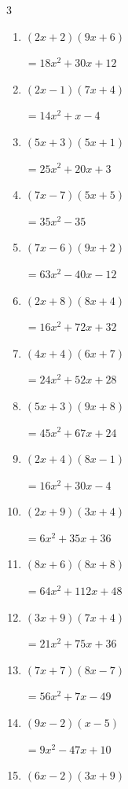 \begin{multicols}{3}
\begin{enumerate}
        $=12x^{2}-x-35$

\columnbreak %

  \item $(2x+2)(9x+6)$

        $=18x^{2}+30x+12$

  \item $(2x-1)(7x+4)$

        $=14x^{2}+x-4$

  \item $(5x+3)(5x+1)$

        $=25x^{2}+20x+3$

  \item $(7x-7)(5x+5)$

        $=35x^{2}-35$

  \item $(7x-6)(9x+2)$

        $=63x^{2}-40x-12$

  \item $(2x+8)(8x+4)$

        $=16x^{2}+72x+32$

  \item $(4x+4)(6x+7)$

        $=24x^{2}+52x+28$

  \item $(5x+3)(9x+8)$

        $=45x^{2}+67x+24$

  \item $(2x+4)(8x-1)$

        $=16x^{2}+30x-4$

  \item $(2x+9)(3x+4)$

        $=6x^{2}+35x+36$

  \item $(8x+6)(8x+8)$

        $=64x^{2}+112x+48$

  \item $(3x+9)(7x+4)$

        $=21x^{2}+75x+36$

  \item $(7x+7)(8x-7)$

        $=56x^{2}+7x-49$

  \item $(9x-2)(x-5)$

        $=9x^{2}-47x+10$

  \item $(6x-2)(3x+9)$


\end{enumerate}
\end{multicols}
